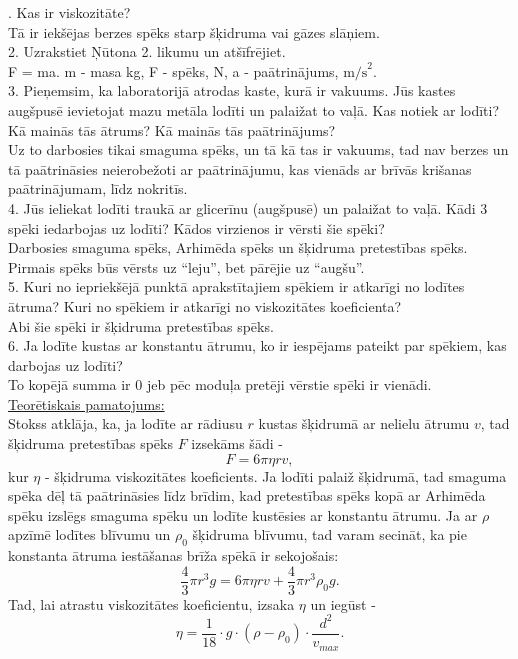 \documentclass[a4paper,12pt]{article}
\begin{document}
. Kas ir viskozitāte?\\
Tā ir iekšējas berzes spēks starp šķidruma vai gāzes slāņiem.\\
2. Uzrakstiet Ņūtona 2. likumu un atšīfrējiet. \\
F = ma. m - masa kg, F - spēks, N, a - paātrinājums, $\text{m/s}^2$.\\
3. Pieņemsim, ka laboratorijā atrodas kaste, kurā ir vakuums. Jūs kastes
augšpusē ievietojat mazu metāla lodīti un palaižat to vaļā. Kas notiek ar
lodīti? Kā mainās tās ātrums? Kā mainās tās paātrinājums?\\ 
Uz to darbosies tikai smaguma spēks, un tā kā tas ir vakuums, tad nav berzes un
tā paātrināsies neierobežoti ar paātrinājumu, kas vienāds ar brīvās krišanas
paātrinājumam, līdz nokritīs. \\
4. Jūs ieliekat lodīti traukā ar glicerīnu (augšpusē) un palaižat to vaļā. Kādi
3 spēki iedarbojas uz lodīti? Kādos virzienos ir vērsti šie spēki? \\
Darbosies smaguma spēks, Arhimēda spēks un šķidruma pretestības spēks. Pirmais spēks būs vērsts
uz ``leju'', bet pārējie uz ``augšu''.\\
5. Kuri no iepriekšējā punktā aprakstītajiem spēkiem ir atkarīgi no lodītes
ātruma? Kuri no spēkiem ir atkarīgi no viskozitātes koeficienta? \\
Abi šie spēki ir šķidruma pretestības spēks.\\
6. Ja lodīte kustas ar konstantu ātrumu, ko ir iespējams pateikt par spēkiem,
kas darbojas uz lodīti? \\
To kopējā summa ir 0 jeb pēc moduļa pretēji vērstie spēki ir vienādi.\\







\noindent
\ul{Teorētiskais pamatojums:}\\

Stokss atklāja, ka, ja lodīte ar rādiusu $r$ kustas šķidrumā ar nelielu
ātrumu $v$, tad šķidruma pretestības spēks $F$ izsekāms šādi -
$$
F = 6\pi\eta rv,
$$
kur $\eta$ - šķidruma viskozitātes koeficients. Ja lodīti palaiž šķidrumā, tad
smaguma spēka dēļ tā paātrināsies līdz brīdim, kad pretestības spēks kopā ar
Arhimēda spēku izslēgs smaguma spēku un lodīte kustēsies ar konstantu ātrumu. Ja
ar $\rho$ apzīmē lodītes blīvumu un $\rho_0$ šķidruma blīvumu, tad varam
secināt, ka pie konstanta ātruma iestāšanas brīža spēkā ir sekojošais:
$$
\frac{4}{3}\pi r^3 g = 6\pi\eta rv +\frac{4}{3}\pi r^3 \rho_0 g.
$$
Tad, lai atrastu viskozitātes koeficientu, izsaka $\eta$ un iegūst -
$$
\eta = \frac{1}{18}\cdot g\cdot (\rho-\rho_0)\cdot \frac{d^2}{v_{max}}.
$$
\end{document}
